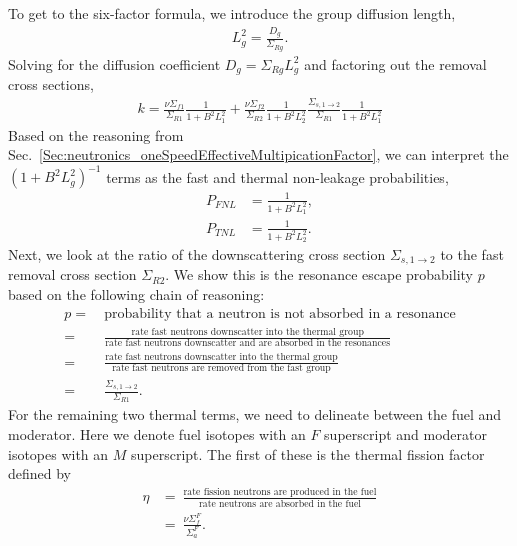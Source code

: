 To get to the six-factor formula, we introduce the group diffusion length,
\begin{align}
  L_g^2 = \frac{D_g}{\Sigma_{Rg}} . \nonumber
\end{align}
Solving for the diffusion coefficient $D_g = \Sigma_{Rg} L_g^2$ and factoring out the removal cross sections,
\begin{align}
  k = \frac{ \nu\Sigma_{f1} }{ \Sigma_{R1} } \frac{ 1 }{ 1 + B^2 L_1^2  } + \frac{ \nu\Sigma_{f2} }{ \Sigma_{R2} } \frac{1}{ 1 + B^2 L_2^2 } \frac{ \Sigma_{s,1\rightarrow 2} }{\Sigma_{R1}} \frac{1}{ 1  + B^2 L_1^2 }
\end{align}
Based on the reasoning from Sec.~\ref{Sec:neutronics_oneSpeedEffectiveMultipicationFactor}, we can interpret the $( 1 + B^2 L_g^2 )^{-1}$ terms as the fast and thermal non-leakage probabilities,
\begin{subequations}
\begin{align}
  P_{FNL} &= \frac{ 1 }{ 1 + B^2 L_1^2  } , \\
  P_{TNL} &= \frac{ 1 }{ 1 + B^2 L_2^2  } .
\end{align}
\end{subequations}
Next, we look at the ratio of the downscattering cross section $\Sigma_{s,1 \rightarrow 2}$ to the fast removal cross section $\Sigma_{R2}$. We show this is the resonance escape probability $p$ based on the following chain of reasoning:
\begin{align}
  p = 
  &\ \text{probability that a neutron is not absorbed in a resonance} \nonumber \\
  = &\ \frac{\text{rate fast neutrons downscatter into the thermal group}}{\text{rate fast neutrons downscatter and are absorbed in the resonances}} \nonumber \\
  = &\ \frac{\text{rate fast neutrons downscatter into the thermal group}}{\text{rate fast neutrons are removed from the fast group}} \nonumber \\
  = &\ \frac{\Sigma_{s,1 \rightarrow 2}}{\Sigma_{R1}} .
\end{align}
For the remaining two thermal terms, we need to delineate between the fuel and moderator. Here we denote fuel isotopes with an $F$ superscript and moderator isotopes with an $M$ superscript. The first of these is the thermal fission factor defined by
\begin{align}
  \eta 	&= \ \frac{\text{rate fission neutrons are produced in the fuel}}{\text{rate neutrons are absorbed in the fuel}} \nonumber \\
  		&= \ \frac{\nu\Sigma_f^F}{\Sigma_a^F} .
\end{align}
